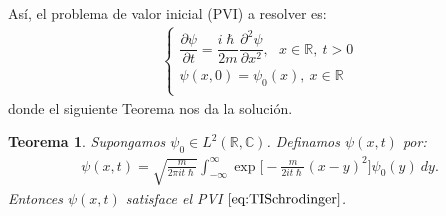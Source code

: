 \documentclass[aspectratio=1610]{beamer}
\newcommand*{\field}[1]{\mathbb{#1}}
\newtheorem*{teo}{Teorema}
\begin{document}
\begin{frame}

Así, el problema de valor inicial (PVI) a resolver es:
    \begin{align}
         \left\{ \begin{array}{ll}
         \dfrac{\partial\psi}{\partial t} = \dfrac{i\hslash}{2m}\dfrac{\partial^2\psi}{\partial x^2},\:\:\:x\in\field{R},\:t>0 \\
         \psi(x,0) = \psi_{0}(x),\:x\in\field{R} \\
         \end{array}
\right.
    \label{eq:TISchrodinger}
    \end{align}
donde el siguiente Teorema nos da la solución.    
\begin{teo}
    Supongamos $\psi_{0} \in L^2(\field{R},\field{C})$. Definamos $\psi(x,t)$ por:
    \begin{align*}
        \psi(x,t) = \sqrt{\frac{m}{2\pi it\hslash}}\int_{-\infty}^{\infty}\exp\bigg[-\frac{m}{2it\hslash}(x-y)^2\bigg]\psi_{0}(y) \: dy.
    \end{align*}
    Entonces $\psi(x,t)$ satisface el PVI $\eqref{eq:TISchrodinger}$.
    \label{teo:Rev4}
\end{teo}

\begin{columns}
\column{37em}
\end{columns}
\end{frame}
\end{document}
